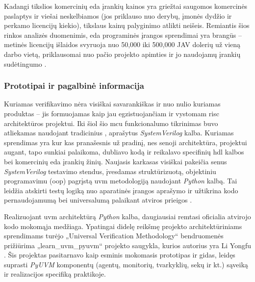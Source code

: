 Kadangi tikslios komercinių \gls{eda} įrankių kainos yra griežtai saugomos komercinės paslaptys ir viešai neskelbiamos (jos priklauso nuo derybų, įmonės dydžio ir perkamo licencijų kiekio), tikslaus kainų palyginimo atlikti neišeis. Remiantis šios rinkos analizės duomenimis, \gls{eda} programinės įrangos sprendimai yra brangūs -- metinės licencijų išlaidos svyruoja nuo 50,000 iki 500,000 JAV dolerių už vieną darbo vietą, priklausomai nuo pačio projekto apimties ir jo naudojamų įrankių sudėtingumo \cite{eda-market-report}.



\subsubsection{Prototipai ir pagalbinė informacija}

Kuriamas verifikavimo  nėra visiškai savarankiškas ir nuo nulio kuriamas produktas -- jis formuojamas kaip  jau egzistuojančiam ir vystomam \gls{risc} architektūros  projektui. Iki šiol šio \gls{mcu} funkcionalumo tikrinimas buvo atliekamas naudojant tradicinius , aprašytus \textit{SystemVerilog} kalba. Kuriamas sprendimas yra kur kas pranašesnis už pradinį, nes senoji architektūra, projektui augant, tapo sunkiai palaikoma, dubliavo kodą ir reikalavo specifinių \gls{hdl} kalbos bei komercinių \gls{eda} įrankių žinių. Naujasis karkasas visiškai pakeičia senus \textit{SystemVerilog} testavimo stendus, įvesdamas struktūrizuotą, objektiniu programavimu (\gls{oop}) pagrįstą \gls{uvm} metodologiją naudojant \textit{Python} kalbą. Tai leidžia atskirti testų logiką nuo aparatinės įrangos aprašymo ir užtikrina kodo pernaudojamumą bei universalumą palaikant atviros prieigos .

Realizuojant \gls{uvm} architektūrą \textit{Python} kalba, daugiausiai remtasi oficialia atvirojo kodo mokomąja medžiaga. Ypatingai didelę reikšmę projekto architektūriniams sprendimams turėjo  „Universal Verification Methodology“ bendruomenės prižiūrima „learn\_uvm\_pyuvm“ projekto saugykla, kurios autorius yra Li Yongfu \cite{learn_uvm_pyuvm}. Šis projektas pasitarnavo kaip esminis mokomasis prototipas ir gidas, leidęs suprasti \textit{PyUVM} komponentų (agentų, monitorių, tvarkyklių, sekų ir kt.) sąveiką ir realizacijos specifiką praktikoje. 

